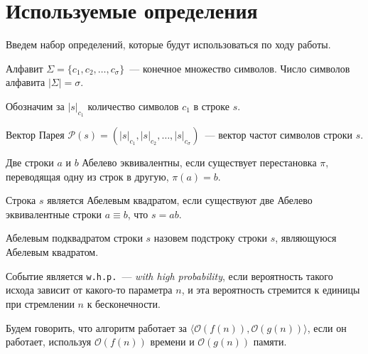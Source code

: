 \section{Используемые определения}

Введем набор определений, которые будут использоваться по ходу работы. 

\begin{definition}
Алфавит $\Sigma=\{c_1, c_2, \ldots, c_\sigma\}$~--- конечное множество символов. Число символов алфавита $|\Sigma|=\sigma$.
\end{definition}

\begin{definition}
Обозначим за $|s|_{c_1}$ количество символов $c_1$ в строке $s$.
\end{definition}


\begin{definition}
Вектор Парея $\mathcal{P}(s)=(|s|_{c_1}, |s|_{c_2}, \ldots, |s|_{c_\sigma})$~--- вектор частот символов строки $s$.
\end{definition}

\begin{definition}
Две строки $a$ и $b$ Абелево эквивалентны, если существует перестановка $\pi$, переводящая одну из строк в другую, $\pi(a)=b$.
\end{definition}

\begin{definition}
Строка $s$ является Абелевым квадратом, если существуют две Абелево эквивалентные строки $a \equiv b$, что $s = ab$.
\end{definition}

\begin{definition}
Абелевым подквадратом строки $s$ назовем подстроку строки $s$, являющуюся Абелевым квадратом.
\end{definition}

\begin{definition}
Событие является \texttt{w.h.p.}~--- \textit{with high probability}, если вероятность такого исхода зависит от какого-то параметра $n$, и эта вероятность стремится к единицы при стремлении $n$ к бесконечности.
\end{definition}

\begin{definition}
Будем говорить, что алгоритм работает за $\langle \mathcal{O}(f(n)), \mathcal{O}(g(n)) \rangle$, если он работает, используя $\mathcal{O}(f(n))$ времени и  $\mathcal{O}(g(n))$ памяти.
\end{definition}

